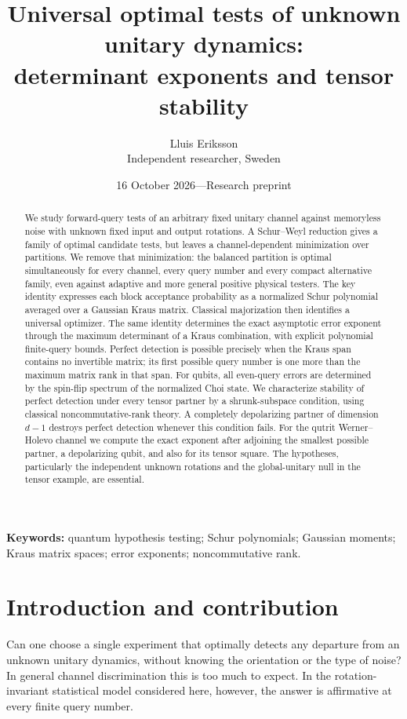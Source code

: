 \documentclass[11pt,a4paper]{article}
\title{Universal optimal tests of unknown unitary dynamics:\\determinant exponents and tensor stability}
\author{Lluis Eriksson\\\small Independent researcher, Sweden}
\date{16 October 2026\quad---\quad Research preprint}
\theoremstyle{remark}\newtheorem{remark}[theorem]{Remark}
\begin{document}
\maketitle
\begin{abstract}
We study forward-query tests of an arbitrary fixed unitary channel against memoryless noise with unknown fixed input and output rotations. A Schur--Weyl reduction gives a family of optimal candidate tests, but leaves a channel-dependent minimization over partitions. We remove that minimization: the balanced partition is optimal simultaneously for every channel, every query number and every compact alternative family, even against adaptive and more general positive physical testers. The key identity expresses each block acceptance probability as a normalized Schur polynomial averaged over a Gaussian Kraus matrix. Classical majorization then identifies a universal optimizer. The same identity determines the exact asymptotic error exponent through the maximum determinant of a Kraus combination, with explicit polynomial finite-query bounds. Perfect detection is possible precisely when the Kraus span contains no invertible matrix; its first possible query number is one more than the maximum matrix rank in that span. For qubits, all even-query errors are determined by the spin-flip spectrum of the normalized Choi state. We characterize stability of perfect detection under every tensor partner by a shrunk-subspace condition, using classical noncommutative-rank theory. A completely depolarizing partner of dimension $d-1$ destroys perfect detection whenever this condition fails. For the qutrit Werner--Holevo channel we compute the exact exponent after adjoining the smallest possible partner, a depolarizing qubit, and also for its tensor square. The hypotheses, particularly the independent unknown rotations and the global-unitary null in the tensor example, are essential.
\end{abstract}
\noindent\textbf{Keywords:} quantum hypothesis testing; Schur polynomials; Gaussian moments; Kraus matrix spaces; error exponents; noncommutative rank.

\section{Introduction and contribution}
Can one choose a single experiment that optimally detects any departure from an unknown unitary dynamics, without knowing the orientation or the type of noise? In general channel discrimination this is too much to expect. In the rotation-invariant statistical model considered here, however, the answer is affirmative at every finite query number.
\end{document}
